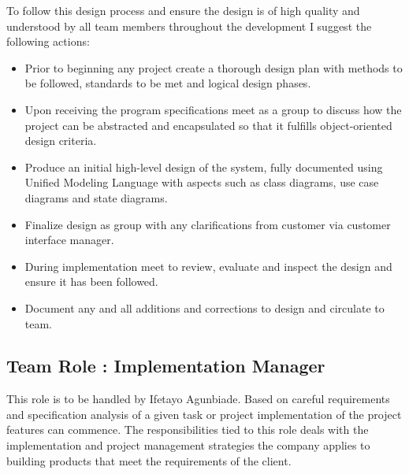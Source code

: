 \documentclass{article}
\begin{document}
To follow this design process and ensure the design is of high quality and understood by all team members throughout the development I suggest the following actions:
\begin{itemize}
\item Prior to beginning any project create a thorough design plan with methods to be followed, standards to be met and logical design phases.
\item Upon receiving the program specifications meet as a group to discuss how the project can be abstracted and encapsulated so that it fulfills object-oriented design criteria.
\item Produce an initial high-level design of the system, fully documented using Unified Modeling Language with aspects such as class diagrams, use case diagrams and state diagrams.
\item Finalize design as group with any clarifications from customer via customer interface manager.
\item During implementation meet to review, evaluate and inspect the design and ensure it has been followed.
\item Document any and all additions and corrections to design and circulate to team.

\end{itemize}

\newpage
\subsection{Team Role : Implementation Manager}
This role is to be handled by Ifetayo Agunbiade. Based on careful requirements and specification analysis of a given task or project implementation of the project features can commence. The responsibilities tied to this role deals with the implementation and project management strategies the company applies to building products that meet the requirements of the client. 
\end{document}
